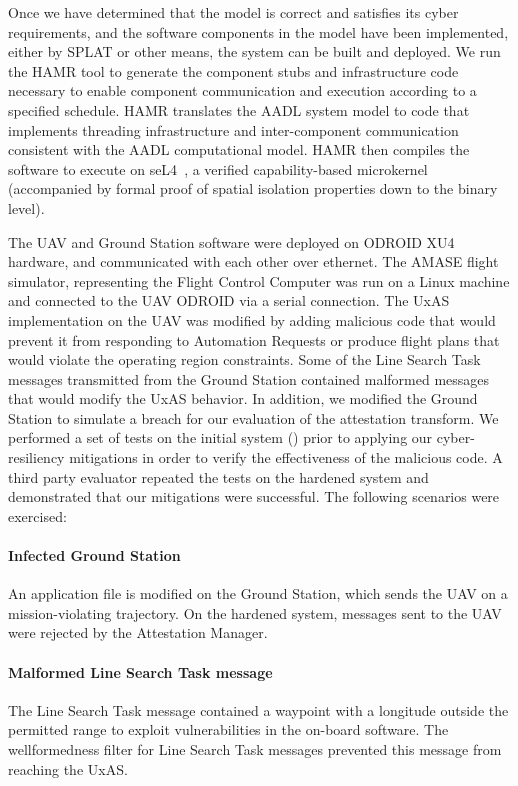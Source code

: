 Once we have determined that the model is correct and satisfies its cyber requirements, and the software components in the model have been implemented, either by SPLAT or other means, the system can be built and deployed.  We run the HAMR tool to generate the component stubs and infrastructure code necessary to enable component communication and execution according to a specified schedule.
HAMR translates the AADL system model to code that implements threading infrastructure and inter-component communication consistent with the AADL computational model.
%
HAMR then compiles the software to execute on seL4~\cite{sel4-2009}, a verified capability-based microkernel (accompanied by formal proof of spatial isolation properties down to the binary level).

The UAV and Ground Station software were deployed on ODROID XU4 hardware, and communicated with each other over ethernet.  The AMASE flight simulator, representing the Flight Control Computer was run on a Linux machine and connected to the UAV ODROID via a serial connection.  The UxAS implementation on the UAV was modified by adding malicious code that would prevent it from responding to Automation Requests or produce flight plans that would violate the operating region constraints.  Some of the Line Search Task messages transmitted from the Ground Station contained malformed messages that would modify the UxAS behavior. In addition, we modified the Ground Station to simulate a breach for our evaluation of the attestation transform.
%
We performed a set of tests on the initial system () prior to applying our cyber-resiliency mitigations in order to verify the effectiveness of the malicious code.  
A third party evaluator repeated the tests on the hardened system and %
demonstrated that our mitigations were successful.
The following scenarios were exercised:

\paragraph{Infected Ground Station} An application file is modified on the Ground Station, which sends the UAV on a mission-violating trajectory.
On the hardened system, messages sent to the UAV were rejected by the Attestation Manager.  

\paragraph{Malformed Line Search Task message} The Line Search Task message contained a waypoint with a longitude outside the permitted range to exploit vulnerabilities in the on-board software.  The wellformedness filter for Line Search Task messages prevented this message from reaching the UxAS.

